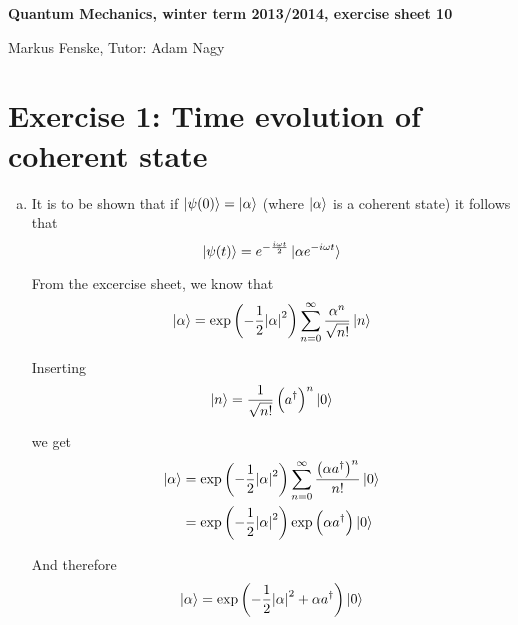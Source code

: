 \documentclass[a4paper,german,12pt,smallheadings]{scrartcl}
\begin{document}
\allowdisplaybreaks %
\begin{center}
\bfseries %
\sffamily %
\vspace{-40pt}
Quantum Mechanics, winter term 2013/2014, exercise sheet 10

Markus Fenske, Tutor: Adam Nagy
\vspace{-10pt}
\end{center}

\section*{Exercise 1: Time evolution of coherent state}
\begin{enumerate}[a)]
  \item
    It is to be shown that if $\ket{\psi(0)} = \ket{\alpha}$ (where
    $\ket{\alpha}$ is a coherent state) it follows that
    \begin{equation*}
      \ket{\psi(t)} = e^{-\frac{i \omega t}{2}} \ket{\alpha e^{-i \omega t}}
    \end{equation*}

    From the excercise sheet, we know that
    \begin{equation}
      \ket{\alpha} = \exp\del{-\frac{1}{2} \envert{\alpha}^2} \sum_{n=0}^\infty \frac{\alpha^n}{\sqrt{n!}} \ket{n}
      \label{from_ex}
    \end{equation}

    Inserting
    \begin{equation*}
      \ket{n} = \frac{1}{\sqrt{n!}} \del{a^\dagger}^n \ket{0}
    \end{equation*}

    we get
    \begin{align*}
      \ket{\alpha} &= \exp\del{-\frac{1}{2} \envert{\alpha}^2} \sum_{n=0}^\infty \frac{\del{\alpha a^\dagger}^n}{n!} \ket{0} \\
                   &= \exp\del{-\frac{1}{2} \envert{\alpha}^2} \exp\del{\alpha a^\dagger} \ket{0} \\
    \end{align*}

    And therefore
    \begin{equation}
      \ket{\alpha} = \exp\del{-\frac{1}{2} \envert{\alpha}^2 + \alpha a^\dagger} \ket{0}
      \label{coherent_state}
    \end{equation}


\end{enumerate}
\end{document}
